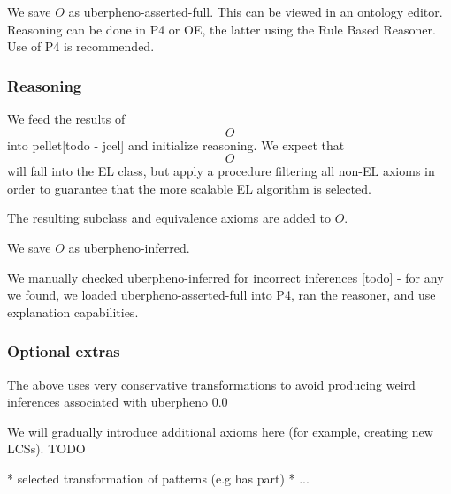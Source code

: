 We save $O$ as uberpheno-asserted-full. This can be viewed in an
ontology editor. Reasoning can be done in P4 or OE, the latter using
the Rule Based Reasoner. Use of P4 is recommended.

\subsubsection{Reasoning}

We feed the results of $$O$$ into pellet[todo - jcel] and initialize reasoning. We
expect that $$O$$ will fall into the EL class, but apply a procedure
filtering all non-EL axioms in order to guarantee that the more
scalable EL algorithm is selected.

The resulting subclass and equivalence axioms are added to $O$.

We save $O$ as uberpheno-inferred.

We manually checked uberpheno-inferred for incorrect inferences [todo]
- for any we found, we loaded uberpheno-asserted-full into P4, ran the
reasoner, and use explanation capabilities.

\subsubsection{Optional extras}

The above uses very conservative transformations to avoid producing
weird inferences associated with uberpheno 0.0

We will gradually introduce additional axioms here (for example,
creating new LCSs). TODO

* selected transformation of patterns (e.g has part)
* ...








